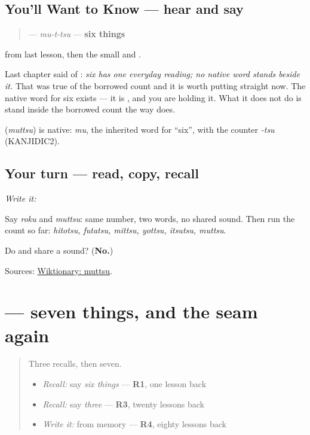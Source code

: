 \subsection*{You'll Want to Know — hear and say}
\begin{quote}
\textbf{} — \emph{mu-t-tsu} — \textbf{six things}
\end{quote}

\textbf{} from last lesson, then the small \textbf{} and \textbf{}.

Last chapter said of \textbf{}: \emph{six has one everyday reading; no native word stands beside it.} That was true of the borrowed count and it is worth putting straight now. The native word for six exists — it is \textbf{}, and you are holding it. What it does not do is stand inside the borrowed count the way \textbf{} does.

\begin{cousinweb}
\textbf{} (\emph{muttsu}) is native: \emph{mu}, the inherited word for \textquotedblleft{}six\textquotedblright{}, with the counter \emph{-tsu} (KANJIDIC2).
\end{cousinweb}

\subsection*{Your turn — read, copy, recall}
\emph{Write it:} \textbf{}

Say \emph{roku} and \emph{muttsu}: same number, two words, no shared sound. Then run the count so far: \emph{hitotsu, futatsu, mittsu, yottsu, itsutsu, muttsu}.

\begin{tcolorbox}[breakable,colback=teal!4,colframe=teal!35!black,title={Before you move on}]
Do \textbf{} and \textbf{} share a sound? (\textbf{No.})

Sources: \href{https://en.wiktionary.org/wiki/\%E5\%85\%AD\%E3\%81\%A4}{Wiktionary: muttsu}.
\end{tcolorbox}
\section[\texorpdfstring{\ja{ななつ} (nanatsu)}{ななつ (nanatsu)}]{ — seven things, and the seam again}

\label{lesson:JA-C17-nanatsu}



\begin{quote}
Three recalls, then seven.

\begin{itemize}
\raggedright
  \item \emph{Recall:} say \emph{six things} — \textbf{R1}, one lesson back
  \item \emph{Recall:} say \emph{three} — \textbf{R3}, twenty lessons back
  \item \emph{Write it:} \textbf{} from memory — \textbf{R4}, eighty lessons back
\end{itemize}
\end{quote}

